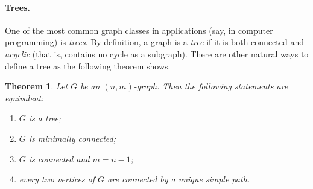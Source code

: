 \documentclass[12pt,notitlepage]{article}
\theoremstyle{plain}
\newtheorem{thm}{Theorem}[section]
\theoremstyle{definition}
\theoremstyle{plain}
\newcommand{\1}{\mathbf{1}}
\newcommand{\0}{\mathbf{0}}
\begin{document}
\paragraph{Trees.} One of the most common graph classes in applications (say, in computer programming) is \emph{trees}. By definition, a graph is a \emph{tree} if it is both connected and \emph{acyclic} (that is, contains no cycle as a subgraph). There are other natural ways to define a tree as the following theorem shows.
\begin{thm}\label{L14:t_tree}
Let $G$ be an $(n,m)$-graph. Then the following statements are equivalent:
\begin{enumerate}
\item $G$ is a tree;
\item $G$ is minimally connected;
\item $G$ is connected and $m = n - 1$;
\item every two vertices of $G$ are connected by a unique simple path.
\end{enumerate}
\end{thm}
\end{document}
